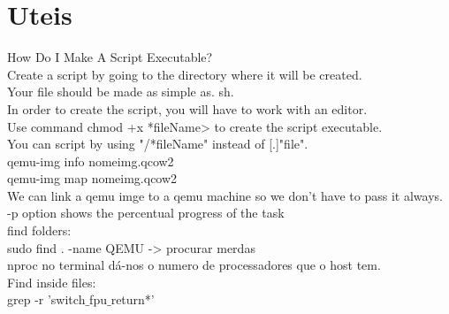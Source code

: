\documentclass[11pt, a4paper, oneside]{article}
\theoremstyle{definition}
\begin{document}
\vfill
\pagebreak
\section{Uteis}

How Do I Make A Script Executable?\\
Create a script by going to the directory where it will be created.\\
Your file should be made as simple as. sh.\\
In order to create the script, you will have to work with an editor.\\
Use command chmod +x *fileName> to create the script executable.\\
You can script by using "/*fileName" instead of [.]"file".\\

qemu-img info nomeimg.qcow2\\
qemu-img map nomeimg.qcow2\\

We can link a qemu imge to a qemu machine so we don't have to pass it always. \\

-p option shows the percentual progress of the task\\

find folders:\\
sudo find . -name QEMU -> procurar merdas\\

nproc no terminal dá-nos o numero de processadores que o host tem.\\

Find inside files:\\
grep -r 'switch$\_$fpu$\_$return*'

\end{document}
